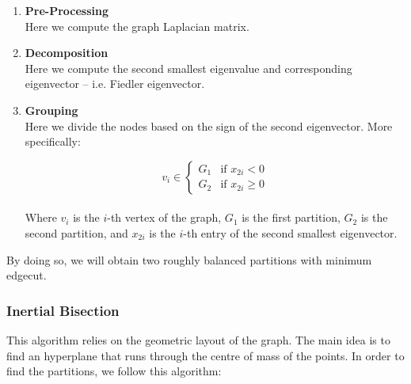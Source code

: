 \documentclass{article}
\begin{document}
\begin{enumerate}
	\item \textbf{Pre-Processing}
	\vspace{.2cm} \\
	Here we compute the graph Laplacian matrix.
	
	\item \textbf{Decomposition}
	\vspace{.2cm} \\
	Here we compute the second smallest eigenvalue and corresponding eigenvector -- i.e. Fiedler eigenvector.
	
	\item \textbf{Grouping}
	\vspace{.2cm} \\
	Here we divide the nodes based on the sign of the second eigenvector. More specifically:
	
	\[ v_i \in \begin{cases} G_1 & \text{if $x_{2i} < 0$} \\ G_2 & \text{if $x_{2i} \geq 0$} \end{cases} \] \\
	Where $v_i$ is the $i$-th vertex of the graph, $G_1$ is the first partition, $G_2$ is the second partition, and $x_{2i}$ is the $i$-th entry of the second smallest eigenvector.
\end{enumerate}
By doing so, we will obtain two roughly balanced partitions with minimum edgecut.

\subsubsection{Inertial Bisection}
This algorithm relies on the geometric layout of the graph. The main idea is to find an hyperplane that runs through the centre of mass of the points. In order to find the partitions, we follow this algorithm:
\end{document}
